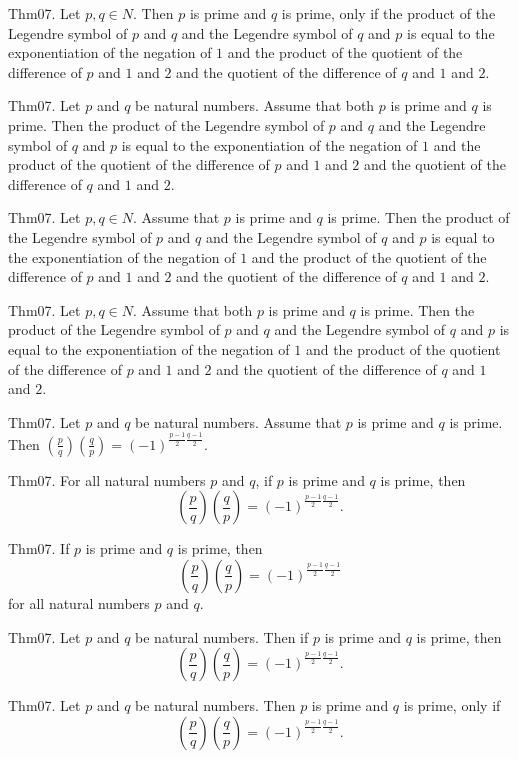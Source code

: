 \documentclass{article}
\begin{document}
Thm07. Let $p , q \in N$. Then $p$ is prime and $q$ is prime, only if the product of the Legendre symbol of $p$ and $q$ and the Legendre symbol of $q$ and $p$ is equal to the exponentiation of the negation of $1$ and the product of the quotient of the difference of $p$ and $1$ and $2$ and the quotient of the difference of $q$ and $1$ and $2$.

Thm07. Let $p$ and $q$ be natural numbers. Assume that both $p$ is prime and $q$ is prime. Then the product of the Legendre symbol of $p$ and $q$ and the Legendre symbol of $q$ and $p$ is equal to the exponentiation of the negation of $1$ and the product of the quotient of the difference of $p$ and $1$ and $2$ and the quotient of the difference of $q$ and $1$ and $2$.

Thm07. Let $p , q \in N$. Assume that $p$ is prime and $q$ is prime. Then the product of the Legendre symbol of $p$ and $q$ and the Legendre symbol of $q$ and $p$ is equal to the exponentiation of the negation of $1$ and the product of the quotient of the difference of $p$ and $1$ and $2$ and the quotient of the difference of $q$ and $1$ and $2$.

Thm07. Let $p , q \in N$. Assume that both $p$ is prime and $q$ is prime. Then the product of the Legendre symbol of $p$ and $q$ and the Legendre symbol of $q$ and $p$ is equal to the exponentiation of the negation of $1$ and the product of the quotient of the difference of $p$ and $1$ and $2$ and the quotient of the difference of $q$ and $1$ and $2$.

Thm07. Let $p$ and $q$ be natural numbers. Assume that $p$ is prime and $q$ is prime. Then $\left(\frac{ p }{ q }\right) \left(\frac{ q }{ p }\right) = (- 1)^ {\frac{ p - 1}{2}\frac{ q - 1}{2}}$.

Thm07. For all natural numbers $p$ and $q$, if $p$ is prime and $q$ is prime, then $$\left(\frac{ p }{ q }\right) \left(\frac{ q }{ p }\right) = (- 1)^ {\frac{ p - 1}{2}\frac{ q - 1}{2}}.$$

Thm07. If $p$ is prime and $q$ is prime, then $$\left(\frac{ p }{ q }\right) \left(\frac{ q }{ p }\right) = (- 1)^ {\frac{ p - 1}{2}\frac{ q - 1}{2}}$$ for all natural numbers $p$ and $q$.

Thm07. Let $p$ and $q$ be natural numbers. Then if $p$ is prime and $q$ is prime, then $$\left(\frac{ p }{ q }\right) \left(\frac{ q }{ p }\right) = (- 1)^ {\frac{ p - 1}{2}\frac{ q - 1}{2}}.$$

Thm07. Let $p$ and $q$ be natural numbers. Then $p$ is prime and $q$ is prime, only if $$\left(\frac{ p }{ q }\right) \left(\frac{ q }{ p }\right) = (- 1)^ {\frac{ p - 1}{2}\frac{ q - 1}{2}}.$$
\end{document}
